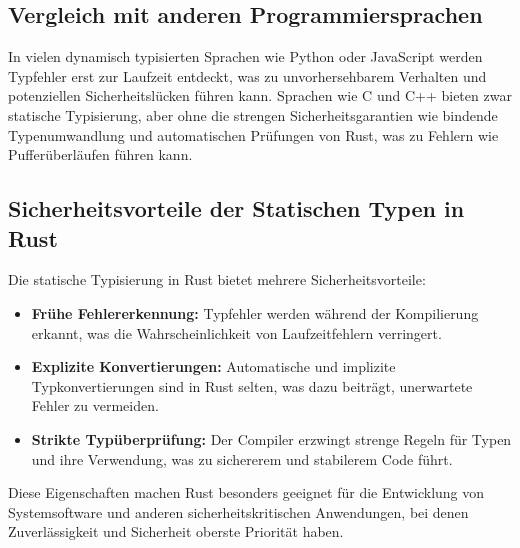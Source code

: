 \subsection{Vergleich mit anderen Programmiersprachen}

In vielen dynamisch typisierten Sprachen wie Python oder JavaScript werden Typfehler erst zur Laufzeit entdeckt, was zu unvorhersehbarem Verhalten und potenziellen Sicherheitslücken führen kann. 
Sprachen wie C und C++ bieten zwar statische Typisierung, aber ohne die strengen Sicherheitsgarantien wie bindende Typenumwandlung und automatischen Prüfungen von Rust, was zu Fehlern wie Pufferüberläufen führen kann.

\subsection{Sicherheitsvorteile der Statischen Typen in Rust}

Die statische Typisierung in Rust bietet mehrere Sicherheitsvorteile:
\begin{itemize}
    \item \textbf{Frühe Fehlererkennung:} Typfehler werden während der Kompilierung erkannt, was die Wahrscheinlichkeit von Laufzeitfehlern verringert.
    \item \textbf{Explizite Konvertierungen:} Automatische und implizite Typkonvertierungen sind in Rust selten, was dazu beiträgt, unerwartete Fehler zu vermeiden.
    \item \textbf{Strikte Typüberprüfung:} Der Compiler erzwingt strenge Regeln für Typen und ihre Verwendung, was zu sichererem und stabilerem Code führt.
\end{itemize}
\noindent
Diese Eigenschaften machen Rust besonders geeignet für die Entwicklung von Systemsoftware und anderen sicherheitskritischen Anwendungen, bei denen Zuverlässigkeit und Sicherheit oberste Priorität haben.
